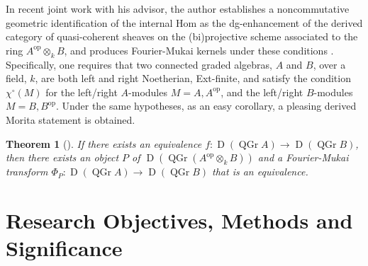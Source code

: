 \documentclass[11pt]{article}
\newtheorem{theorem}{Theorem}[section]
\begin{document}
In recent joint work with his advisor, the author establishes a noncommutative geometric identification of the internal Hom as the dg-enhancement of the derived category of quasi-coherent sheaves on the (bi)projective scheme associated to the ring $A^{\operatorname{op}} \otimes_k B$, and produces Fourier-Mukai kernels under these conditions \cite{BF17}.
Specifically, one requires that two connected graded algebras, $A$ and $B$, over a field, $k$, are both left and right Noetherian, Ext-finite, and satisfy the condition $\chi^\circ(M)$ for the left/right $A$-modules $M = A, A^{\operatorname{op}}$, and the left/right $B$-modules $M = B, B^{\operatorname{op}}$.
Under the same hypotheses, as an easy corollary, a pleasing derived Morita statement is obtained.
\begin{theorem}[\cite{BF17}]
  If there exists an equivalence
  $f \colon \operatorname{D}(\operatorname{QGr} A) \to \operatorname{D}(\operatorname{QGr} B)$,
  then there exists an object $P$ of $\operatorname{D}\left(\operatorname{QGr} \left(A^{\operatorname{op}} \otimes_k B\right)\right)$ and a Fourier-Mukai transform
  $\Phi_P \colon \operatorname{D}(\operatorname{QGr} A) \to \operatorname{D}(\operatorname{QGr} B)$
  that is an equivalence.
\end{theorem}



\section{Research Objectives, Methods and Significance}
\end{document}

